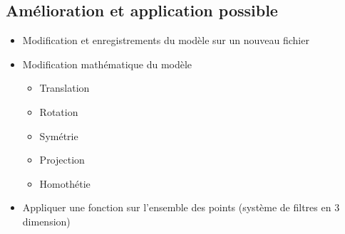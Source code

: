 \documentclass[a4paper,11pt]{article}
\begin{document}
\subsection{Amélioration et application possible}
\begin{itemize}
\item Modification et enregistrements du modèle sur un nouveau fichier
\item Modification mathématique du modèle
\begin{itemize}
\item Translation
\item Rotation
\item Symétrie
\item Projection
\item Homothétie
\end{itemize}
\item Appliquer une fonction sur l'ensemble des points (système de filtres en 3 dimension)
\end{itemize}


\newpage
\end{document}
